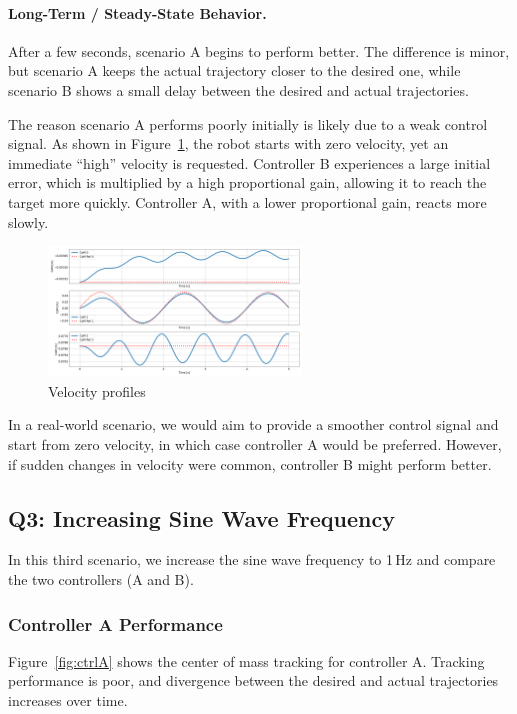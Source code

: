 \documentclass[12pt]{article}
\begin{document}
\paragraph{Long-Term / Steady-State Behavior.}
After a few seconds, scenario A begins to perform better.  
The difference is minor, but scenario A keeps the actual trajectory closer to the desired one, while scenario B shows a small delay between the desired and actual trajectories.

The reason scenario A performs poorly initially is likely due to a weak control signal.  
As shown in Figure~\ref{fig:velocity}, the robot starts with zero velocity, yet an immediate “high” velocity is requested.
Controller B experiences a large initial error, which is multiplied by a high proportional gain, allowing it to reach the target more quickly.
Controller A, with a lower proportional gain, reacts more slowly.

\begin{figure}[h!]
\centering
\includegraphics[width=0.6\textwidth]{./images/3.2.vel.png}
\caption{Velocity profiles}
\label{fig:velocity}
\end{figure}

In a real-world scenario, we would aim to provide a smoother control signal and start from zero velocity, in which case controller A would be preferred.
However, if sudden changes in velocity were common, controller B might perform better.

\subsection{Q3: Increasing Sine Wave Frequency}

In this third scenario, we increase the sine wave frequency to 1\,Hz and compare the two controllers (A and B).

\subsubsection{Controller A Performance}

Figure~\ref{fig:ctrlA} shows the center of mass tracking for controller A.  
Tracking performance is poor, and divergence between the desired and actual trajectories increases over time.
\end{document}
